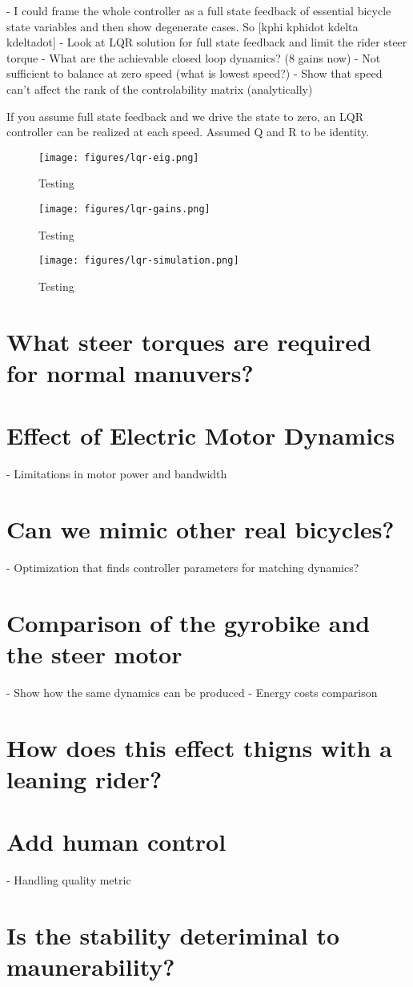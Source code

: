 \documentclass[12pt]{article}
\begin{document}
- I could frame the whole controller as a full state feedback of essential
bicycle state variables and then show degenerate cases. So [kphi kphidot kdelta
kdeltadot]
- Look at LQR solution for full state feedback and limit the rider steer torque
- What are the achievable closed loop dynamics? (8 gains now)
- Not sufficient to balance at zero speed (what is lowest speed?)
- Show that speed can't affect the rank of the controlability matrix
(analytically)

If you assume full state feedback and we drive the state to zero, an LQR
controller can be realized at each speed. Assumed Q and R to be identity.

\begin{figure}
  \centering
  \texttt{[image: figures/lqr-eig.png]}
  \caption{Testing}
  \label{fig:lqr-eig}
\end{figure}

\begin{figure}
  \centering
  \texttt{[image: figures/lqr-gains.png]}
  \caption{Testing}
  \label{fig:lqr-gains}
\end{figure}

\begin{figure}
  \centering
  \texttt{[image: figures/lqr-simulation.png]}
  \caption{Testing}
  \label{fig:lqr-simulation}
\end{figure}

\section{What steer torques are required for normal manuvers?}

\section{Effect of Electric Motor Dynamics}

- Limitations in motor power and bandwidth

\section{Can we mimic other real bicycles?}

- Optimization that finds controller parameters for matching dynamics?

\section{Comparison of the gyrobike and the steer motor}

- Show how the same dynamics can be produced
- Energy costs comparison

\section{How does this effect thigns with a leaning rider?}

\section{Add human control}

- Handling quality metric

\section{Is the stability deteriminal to maunerability?}
\end{document}

